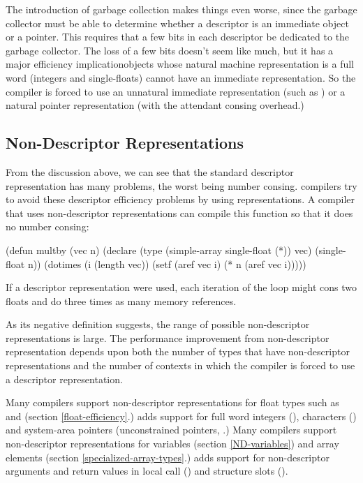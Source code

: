 The introduction of garbage collection makes things even worse, since
the garbage collector must be able to determine whether a descriptor
is an immediate object or a pointer.  This requires that a few bits in
each descriptor be dedicated to the garbage collector.  The loss of a
few bits doesn't seem like much, but it has a major efficiency
implication\dash{}objects whose natural machine representation is a
full word (integers and single-floats) cannot have an immediate
representation.  So the compiler is forced to use an unnatural
immediate representation (such as ) or a natural pointer
representation (with the attendant consing overhead.)


\subsection{Non-Descriptor Representations}
\label{non-descriptor}

From the discussion above, we can see that the standard descriptor
representation has many problems, the worst being number consing.
\llisp{} compilers try to avoid these descriptor efficiency problems by using
 representations.  A compiler that uses non-descriptor
representations can compile this function so that it does no number consing:
\begin{lisp}
(defun multby (vec n)
  (declare (type (simple-array single-float (*)) vec)
           (single-float n))
  (dotimes (i (length vec))
    (setf (aref vec i)
          (* n (aref vec i)))))
\end{lisp}
If a descriptor representation were used, each iteration of the loop might
cons two floats and do three times as many memory references.

As its negative definition suggests, the range of possible non-descriptor
representations is large.  The performance improvement from non-descriptor
representation depends upon both the number of types that have non-descriptor
representations and the number of contexts in which the compiler is forced to
use a descriptor representation.

Many \llisp{} compilers support non-descriptor representations for
float types such as  and 
(section \ref{float-efficiency}.)  \python{} adds support for full
word integers (), characters
() and system-area pointers (unconstrained
pointers, .)  Many \llisp{} compilers
support non-descriptor representations for variables (section
\ref{ND-variables}) and array elements (section
\ref{specialized-array-types}.)  \python{} adds support for
non-descriptor arguments and return values in local call
() and structure slots ().


